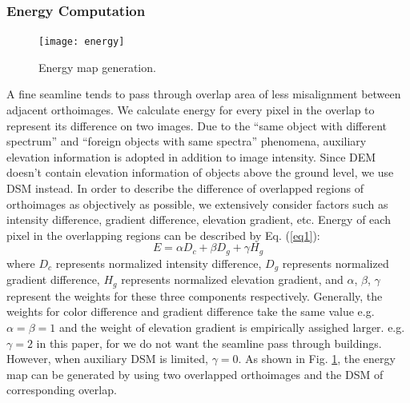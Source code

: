 \documentclass[journal]{IEEEtran}
\begin{document}
\subsubsection{Energy Computation}
\begin{figure}[!t]
	\centering
	\texttt{[image: energy]}
	\caption{Energy map generation.}
	\label{fig:energymap}
\end{figure}
A fine seamline tends to pass through overlap area of less misalignment between adjacent orthoimages. We calculate energy for every pixel in the overlap to represent its difference on two images. Due to the ``same object with different spectrum'' and ``foreign objects with same spectra'' phenomena, auxiliary elevation information is adopted in addition to image intensity. Since DEM doesn't contain elevation information of objects above the ground level, we use DSM instead. In order to describe the difference of overlapped regions of orthoimages as objectively as possible, we extensively consider factors such as intensity difference, gradient difference, elevation gradient, etc. Energy of each pixel in the overlapping regions can be described by Eq. (\ref{eq1}):
\begin{equation}\label{eq1}
E=\alpha D_{c}+\beta D_{g}+\gamma H_{g}
\end{equation}
where $D_{c}$ represents normalized intensity difference, $D_{g}$ represents normalized gradient difference, $H_{g}$ represents normalized elevation gradient, and $\alpha$, $\beta$, $\gamma$ represent the weights for these three components respectively. Generally, the weights for color difference and gradient difference take the same value e.g. $\alpha = \beta = 1$ and the weight of elevation gradient is empirically assighed larger. e.g. $\gamma = 2$ in this paper, for we do not want the seamline pass through buildings. However, when auxiliary DSM is limited, $\gamma = 0$. As shown in Fig. \ref{fig:energymap}, the energy map can be generated by using two overlapped orthoimages and the DSM of corresponding overlap.
\end{document}

